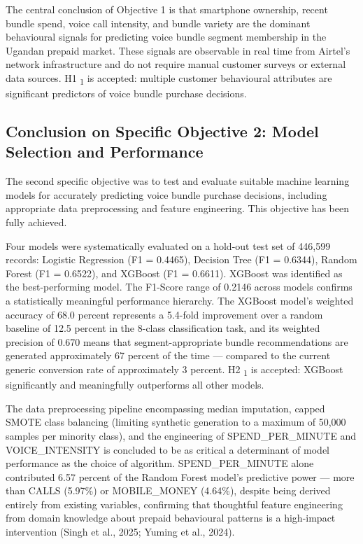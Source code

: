 The central conclusion of Objective 1 is that smartphone ownership, recent bundle spend, voice call intensity, and bundle variety are the dominant behavioural signals for predicting voice bundle segment membership in the Ugandan prepaid market. These signals are observable in real time from Airtel's network infrastructure and do not require manual customer surveys or external data sources. H1	\textsubscript{1} is accepted: multiple customer behavioural attributes are significant predictors of voice bundle purchase decisions.


\subsection{Conclusion on Specific Objective 2: Model Selection and Performance}

The second specific objective was to test and evaluate suitable machine learning models for accurately predicting voice bundle purchase decisions, including appropriate data preprocessing and feature engineering. This objective has been fully achieved.

Four models were systematically evaluated on a hold-out test set of 446,599 records: Logistic Regression (F1 = 0.4465), Decision Tree (F1 = 0.6344), Random Forest (F1 = 0.6522), and XGBoost (F1 = 0.6611). XGBoost was identified as the best-performing model. The F1-Score range of 0.2146 across models confirms a statistically meaningful performance hierarchy. The XGBoost model's weighted accuracy of 68.0 percent represents a 5.4-fold improvement over a random baseline of 12.5 percent in the 8-class classification task, and its weighted precision of 0.670 means that segment-appropriate bundle recommendations are generated approximately 67 percent of the time --- compared to the current generic conversion rate of approximately 3 percent. H2	\textsubscript{1} is accepted: XGBoost significantly and meaningfully outperforms all other models.

The data preprocessing pipeline encompassing median imputation, capped SMOTE class balancing (limiting synthetic generation to a maximum of 50,000 samples per minority class), and the engineering of SPEND\_PER\_MINUTE and VOICE\_INTENSITY is concluded to be as critical a determinant of model performance as the choice of algorithm. SPEND\_PER\_MINUTE alone contributed 6.57 percent of the Random Forest model's predictive power --- more than CALLS (5.97\%) or MOBILE\_MONEY (4.64\%), despite being derived entirely from existing variables, confirming that thoughtful feature engineering from domain knowledge about prepaid behavioural patterns is a high-impact intervention (Singh et al., 2025; Yuming et al., 2024).


